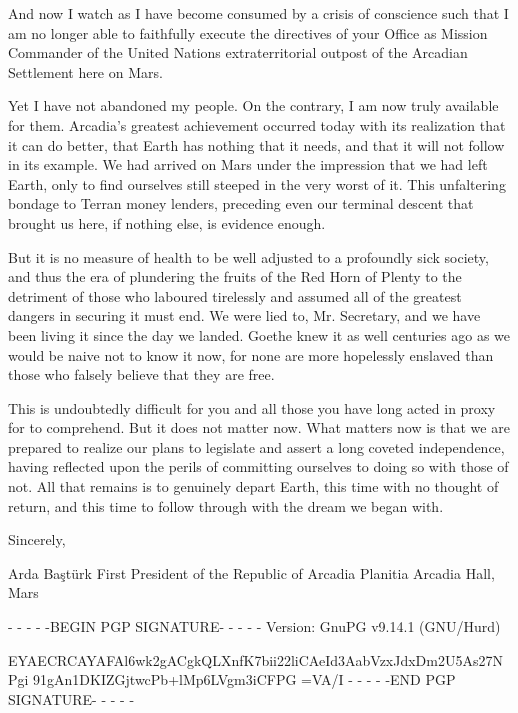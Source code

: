 And now I watch as I have become consumed by a crisis of conscience such that I am no longer able to faithfully execute the directives of your Office as Mission Commander of the United Nations extraterritorial outpost of the Arcadian Settlement here on Mars.

Yet I have not abandoned my people. On the contrary, I am now truly available for them. Arcadia's greatest achievement occurred today with its realization that it can do better, that Earth has nothing that it needs, and that it will not follow in its example. We had arrived on Mars under the impression that we had left Earth, only to find ourselves still steeped in the very worst of it. This unfaltering bondage to Terran money lenders, preceding even our terminal descent that brought us here, if nothing else, is evidence enough.

But it is no measure of health to be well adjusted to a profoundly sick society, and thus the era of plundering the fruits of the Red Horn of Plenty to the detriment of those who laboured tirelessly and assumed all of the greatest dangers in securing it must end. We were lied to, Mr. Secretary, and we have been living it since the day we landed. Goethe knew it as well centuries ago as we would be naive not to know it now, for none are more hopelessly enslaved than those who falsely believe that they are free.

This is undoubtedly difficult for you and all those you have long acted in proxy for to comprehend. But it does not matter now. What matters now is that we are prepared to realize our plans to legislate and assert a long coveted independence, having reflected upon the perils of committing ourselves to doing so with those of not. All that remains is to genuinely depart Earth, this time with no thought of return, and this time to follow through with the dream we began with.

Sincerely, 

\hskip 1.5cm 
   
Arda Baştürk
First President of the Republic of Arcadia Planitia
Arcadia Hall, Mars

- - - - -BEGIN PGP SIGNATURE- - - - -
Version: GnuPG v9.14.1 (GNU/Hurd)

EYAECRCAYAFAl6wk2gACgkQLXnfK7bii22liCAeId3AabVzxJdxDm2U5As27NPgi
91gAn1DKIZGjtwcPb+lMp6LVgm3iCFPG
=VA/I
- - - - -END PGP SIGNATURE- - - - -
\stoplines

